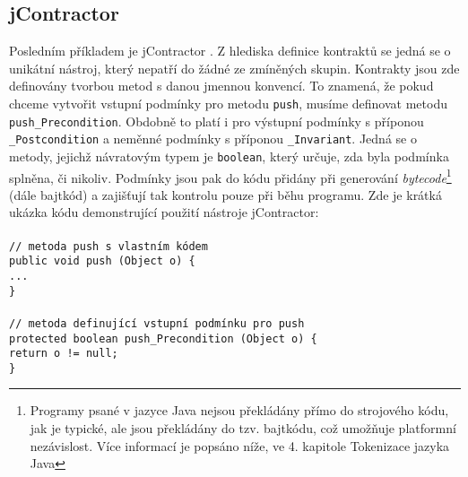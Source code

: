 		\subsection{jContractor}
			Posledním příkladem je jContractor \cite{jcontractor}. Z hlediska definice kontraktů se jedná se o unikátní nástroj, který nepatří do žádné ze zmíněných skupin. Kontrakty jsou zde definovány tvorbou metod s danou jmennou konvencí. To znamená, že pokud chceme vytvořit vstupní podmínky pro metodu \texttt{push}, musíme definovat metodu \texttt{push\_Precondition}. Obdobně to platí i pro výstupní podmínky s příponou \texttt{\_Postcondition} a neměnné podmínky s příponou \texttt{\_Invariant}. Jedná se o metody, jejichž návratovým typem je \texttt{boolean}, který určuje, zda byla podmínka splněna, či nikoliv. Podmínky jsou pak do kódu přidány při generování \emph{bytecode}\footnote{Programy psané v jazyce Java nejsou překládány přímo do strojového kódu, jak je typické, ale jsou překládány do tzv. bajtkódu, což umožňuje platformní nezávislost. Více informací je popsáno níže, ve 4. kapitole Tokenizace jazyka Java} (dále bajtkód) a zajišťují tak kontrolu pouze při běhu programu. Zde je krátká ukázka kódu demonstrující použití nástroje jContractor:\\\\  
				\- \- \- \- \- \texttt{\textcolor{pgrey}{// metoda push s vlastním kódem}}\\
				\- \- \- \- \- \texttt{public void push (Object o) \{}\\
				\- \- \- \- \- \- \- \- \- \- \texttt{...}\\
				\- \- \- \- \- \texttt{\}}\\\\
				\- \- \- \- \- \texttt{\textcolor{pgrey}{// metoda definující vstupní podmínku pro push}}\\
				\- \- \- \- \- \texttt{protected boolean push\_Precondition (Object o) \{}\\
				\- \- \- \- \- \- \- \- \- \- \texttt{return o != null;}\\
				\- \- \- \- \- \texttt{\}}\\
				

